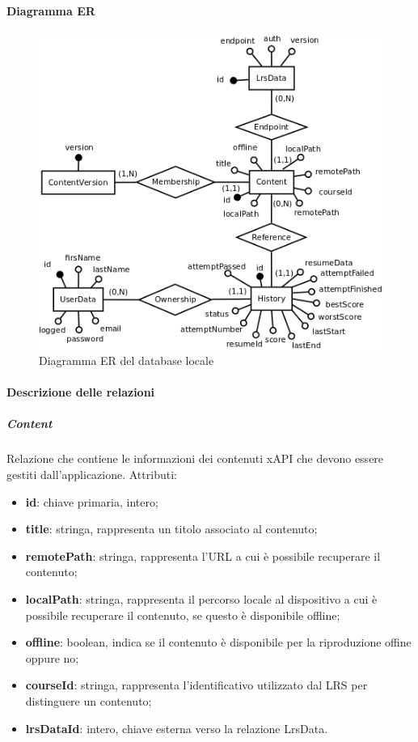 \documentclass[../Tesi.tex]{subfiles}
\begin{document}
			\paragraph{Diagramma ER}
			\hfill \break
				\begin{figure} [H]
					\centering
					\includegraphics[scale=0.9]{images/er/RealmDB}
						\caption{Diagramma ER del database locale}
				\end{figure}

			\paragraph{Descrizione delle relazioni}
			\subparagraph*{Content}
			Relazione che contiene le informazioni dei contenuti xAPI che devono essere gestiti dall'applicazione. Attributi:
			\begin{itemize}
				\item \textbf{id}: chiave primaria, intero;
				\item \textbf{title}: stringa, rappresenta un titolo associato al contenuto;
				\item \textbf{remotePath}: stringa, rappresenta l'URL a cui è possibile recuperare il contenuto;
				\item \textbf{localPath}: stringa, rappresenta il percorso locale al dispositivo a cui è possibile recuperare il contenuto, se questo è disponibile offline;
				\item \textbf{offline}: boolean, indica se il contenuto è disponibile per la riproduzione offine oppure no;
				\item \textbf{courseId}: stringa, rappresenta l'identificativo utilizzato dal LRS per distinguere un contenuto;
				\item \textbf{lrsDataId}: intero, chiave esterna verso la relazione LrsData.
			\end{itemize}
\end{document}
